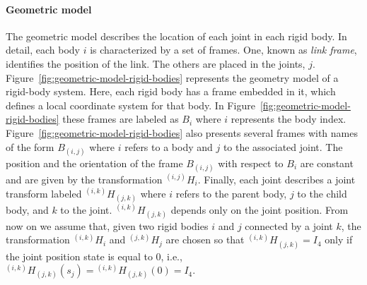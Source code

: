 \paragraph{Geometric model}
The geometric model describes the location of each joint in each rigid body. In detail, each body $i$ is characterized by a set of frames. One, known as \emph{link frame}, identifies the position of the link. The others are placed in the joints, $j$. Figure~\ref{fig:geometric-model-rigid-bodies} represents the geometry model of a rigid-body system. Here, each rigid body has a frame embedded in it, which defines a local coordinate system for that body. In Figure~\ref{fig:geometric-model-rigid-bodies} these frames are labeled as $B_i$ where $i$ represents the body index. Figure~\ref{fig:geometric-model-rigid-bodies} also presents several frames with names of the form $B_{(i,j)}$ where $i$ refers to a body and $j$ to the associated joint. The position and the orientation of the frame $B_{(i,j)}$ with respect to $B_i$ are constant and are given by the transformation ${}^{(i,j)} H _i$. Finally, each joint describes a joint transform labeled ${}^{(i,k)} H _ {(j, k)}$ where $i$ refers to the parent body, $j$ to the child body, and $k$ to the joint. ${}^{(i,k)} H _ {(j, k)}$ depends only on the joint position. 
From now on we assume that, given two rigid bodies $i$ and $j$ connected by a joint $k$, the transformation ${}^{(i,k)} H _i$ and ${}^{(j,k)} H _j$ are chosen so that ${}^{(i,k)} H _ {(j, k)} = I_4$ only if the joint position state is equal to 0, i.e., ${}^{(i,k)} H _ {(j, k)}(s_j) =  {}^{(i,k)} H _ {(j, k)}(0) = I_4$.


